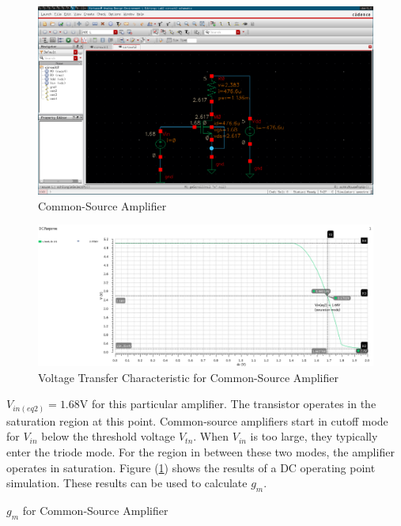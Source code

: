 
\FloatBarrier

\begin{figure}[h!]
	\centering
	\includegraphics[scale=0.75]{../images/circuit2.PNG}
	\caption{Common-Source Amplifier}
	\label{fig:circuit2}
\end{figure}

\FloatBarrier

\FloatBarrier

\begin{figure}[h!]
	\centering
	\includegraphics[scale=0.75]{../images/sim2_vtc.PNG}
	\caption{Voltage Transfer Characteristic for Common-Source Amplifier}
	\label{fig:sim2_vtc}
\end{figure}

\FloatBarrier
$V_{in(eq2)} = 1.68$\si{\volt} for this particular amplifier.
The transistor operates in the saturation region at this point.
Common-source amplifiers start in cutoff mode for $V_{in}$ below the threshold voltage $V_{tn}$.
When $V_{in}$ is too large, they typically enter the triode mode.
For the region in between these two modes, the amplifier operates in saturation.
Figure (\ref{fig:circuit2}) shows the results of a DC operating point simulation.
These results can be used to calculate $g_{m}$.

\FloatBarrier

\begin{table}[h!]
	\centering
	\caption{$g_{m}$ for Common-Source Amplifier}
	\label{tab:common_source_amp_gm}
\end{table}

\FloatBarrier
